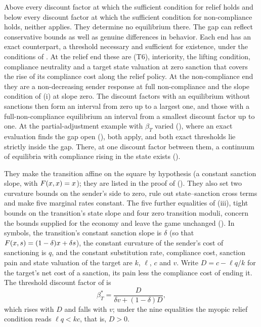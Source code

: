  Above every
discount factor at which the sufficient condition for relief holds and below
every discount factor at which the sufficient condition for non-compliance holds,
neither applies. They determine no equilibrium there. The gap can reflect
conservative bounds as well as genuine differences in behavior. Each end has
an exact counterpart, a threshold necessary and sufficient for existence, under
the conditions of . At the relief end these are \textup{(T6)},
interiority, the lifting condition, compliance neutrality and a target state valuation
at zero sanction that covers the rise of its compliance cost along the relief
policy. At the non-compliance end they are a non-decreasing sender response at full non-compliance
and the slope condition of (i) at slope zero. The discount
factors with an equilibrium without sanctions then form an interval from zero up
to a largest one, and those with a full-non-compliance equilibrium an interval from a
smallest discount factor up to one. At the partial-adjustment example with $\beta_T$ varied
(), where an exact evaluation finds the gap open
(), both apply, and both exact thresholds lie
strictly inside the gap. There, at one discount factor between them, a continuum of
equilibria with compliance rising in the state exists ().

 They make the transition affine on
the square by hypothesis (a constant sanction slope, with $F(x,x)=x$); they are listed in
the proof of  (). They also set two
curvature bounds on the sender's side to zero, rule out state--sanction cross
terms and make five marginal rates constant. The five
further equalities of (iii), tight bounds on the transition's
state slope and four zero transition moduli, concern the bounds supplied
for the economy and leave the game unchanged (). In symbols, the
transition's constant sanction slope is $\delta$ (so that $F(x,s)=(1-\delta)x+\delta s$), the
constant curvature of the sender's cost of sanctioning is $q$, and the constant
substitution rate, compliance cost, sanction pain and state valuation of the target are
$k$, $\ell$, $c$ and $v$. Write $D=c-\ell q/k$ for the target's net cost of a sanction, its pain less the
compliance cost of ending it. The threshold discount
factor of  is
\begin{equation}
\beta_T^{*}=\frac{D}{\delta v+(1-\delta)D},
\label{eq:target-threshold}
\end{equation}
which rises with $D$ and falls with $v$; under the nine equalities the myopic relief
condition reads $\ell q<kc$, that is, $D>0$.

